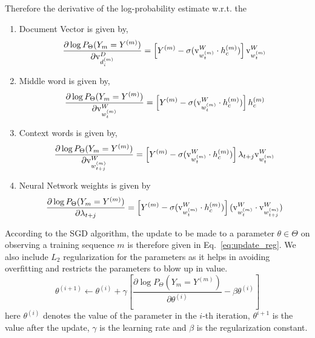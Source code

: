Therefore the derivative of the log-probability estimate w.r.t. the 
\begin{enumerate}
\item
Document Vector is given by, 
\begin{equation}
\label{eq:grad_doc}
\frac{\partial \log P_{\Theta}(Y_{m}=Y^{(m)})} {\partial \mathrm{v}^{D}_{d^{(m)}_{i}}} = \left[ Y^{(m)} - \sigma(\mathrm{v}^{W}_{w^{(m)}_{t}} \cdot h^{(m)}_{c})\right] \mathrm{v}^{W}_{w^{(m)}_{t}}
\end{equation}
\item 
Middle word is given by,
\begin{equation}
\label{eq:grad_mword}
\frac{\partial \log P_{\Theta}(Y_{m}=Y^{(m)})} {\partial \mathrm{v}^{W}_{w^{(m)}_{t}}} = \left[ Y^{(m)} - \sigma(\mathrm{v}^{W}_{w^{(m)}_{t}} \cdot h^{(m)}_{c})\right] h^{(m)}_{c}
\end{equation}
\item 
Context words is given by,
\begin{equation}
\label{eq:grad_cword}
\frac{\partial \log P_{\Theta}(Y_{m}=Y^{(m)})} {\partial \mathrm{v}^{W}_{w^{(m)}_{t+j}}} = \left[ Y^{(m)} - \sigma(\mathrm{v}^{W}_{w^{(m)}_{t}} \cdot h^{(m)}_{c})\right] \lambda_{t+j} \mathrm{v}^{W}_{w^{(m)}_{t}}
\end{equation}
\item 
Neural Network weights is given by
\begin{equation}
\label{eq:grad_wgt}
\frac{\partial \log P_{\Theta}(Y_{m}=Y^{(m)})} {\partial \lambda_{t+j}} = \left[ Y^{(m)} - \sigma(\mathrm{v}^{W}_{w^{(m)}_{t}} \cdot h^{(m)}_{c})\right] (\mathrm{v}^{W}_{w^{(m)}_{t}} \cdot \mathrm{v}^{W}_{w^{(m)}_{t+j}})
\end{equation}
\end{enumerate}
According to the SGD algorithm, the update to be made to a parameter $\theta \in \Theta$ on observing a training sequence $m$ is therefore given in Eq.~\ref{eq:update_reg}. We also include $L_{2}$ regularization for the parameters as it helps in avoiding overfitting and restricts the  parameters to  blow up in value.
\begin{equation}
\label{eq:update_reg}
\theta^{(i+1)} \leftarrow \theta^{(i)} + \gamma \left[\frac{\partial \log P_{\Theta}(Y_{m} = Y^{(m)})}{\partial \theta^{(i)}} - \beta \theta^{(i)} \right]
\end{equation}
here $\theta^{(i)}$ denotes the value of the parameter in the $i$-th iteration, $\theta^{i+1}$ is the value after the update, $\gamma$ is the learning rate and $\beta$ is the regularization constant.
